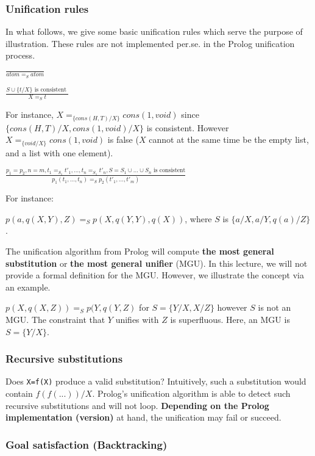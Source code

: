 \subsubsection*{ Unification rules }

In what follows, we give some basic unification rules which serve the purpose of illustration. These rules are not implemented per.se. in the Prolog unification process.

$\displaystyle\frac{}{atom =_S atom}$

$\displaystyle\frac{S \cup \{t/X\} \text{ is consistent }}{X =_S t}$

For instance, $X=_{\{cons(H,T)/X\}} cons(1,void)$ since $\{cons(H,T)/X, cons(1,void)/X\}$ is consistent. However $X =_{\{void/X\}} cons(1,void)$ is false ($X$ cannot at the same time be the empty list, and a list with one element).

$\displaystyle\frac{p_1=p_2, n = m, t_1 =_{S_1} t'_1, \ldots, t_n =_{S_1} t'_n, S = S_1 \cup \ldots \cup S_n \text{ is consistent} }{p_1(t_1, ..., t_n) =_S p_2(t'_1, \ldots, t'_m)}$

For instance:

$p(a,q(X,Y),Z) =_S p(X,q(Y,Y),q(X))$, where $S$ is $\{a/X,a/Y,q(a)/Z\}$.

The unification algorithm from Prolog will compute \textbf{the most general substitution} or \textbf{the most general unifier} (MGU). In this lecture, we will not provide a formal definition for the MGU. However, we illustrate the concept via an example.

$p(X,q(X,Z)) =_S p(Y,q(Y,Z)$ for $S = \{Y/X,X/Z\}$ however $S$ is not an MGU. The constraint that $Y$ unifies with $Z$ is superfluous. Here, an MGU is $S = \{Y/X\}$.

\subsubsection*{ Recursive substitutions }

Does \texttt{X=f(X)} produce a valid substitution? Intuitively, such a substitution would contain $f(f(...))/X$. Prolog's unification algorithm is able to detect such recursive substitutions and will not loop. \textbf{Depending on the Prolog implementation (version)} at hand, the unification may fail or succeed.

\subsubsection*{ Goal satisfaction (Backtracking) }

